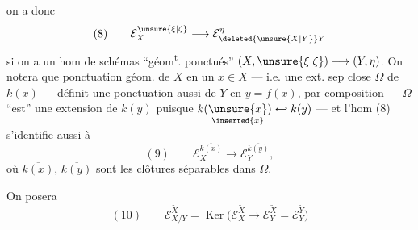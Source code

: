 
on a donc
\[
(8)\qquad \mathcal E_X^{\unsure{\xi|\zeta}}\longrightarrow\mathcal E_{\deleted{\unsure{X|Y}}Y}^\eta
\]
si on a un hom de schémas ``géom\textsuperscript{t}.
ponctués'' $(X,\unsure{\xi|\zeta})\longrightarrow(Y,\eta)$. On
notera que  ponctuation géom.
de $X$ en un $x\in X$ --- i.e. une
ext. sep close $\Omega$ de $k(x)$ ---
définit  une ponctuation  aussi 
de $Y$ en $y=f(x)$,  par composition
--- $\Omega$ ``est'' une extension de $k(y)$ puisque
$k(\underset{\inserted{x}}{\unsure{x}})\hookleftarrow k(y)$ --- et l'hom (8)
s'identifie aussi à
\[
(9)\qquad \mathcal E_X^{\overline{k(x)}}\longrightarrow\mathcal E_Y^{\overline{k(y)}},
\]
où $\overline{k(x)}$, $\overline{k(y)}$ sont les clôtures séparables
\uline{dans $\Omega$}.

On posera
\[
(10)\qquad \mathcal E_{X/Y}^{\widetilde X}=\operatorname{Ker}\bigl(\mathcal E_X^{\widetilde X}\longrightarrow\mathcal E_Y^{\widetilde X}=\mathcal E_Y^{\widetilde Y}\bigr)
\]

